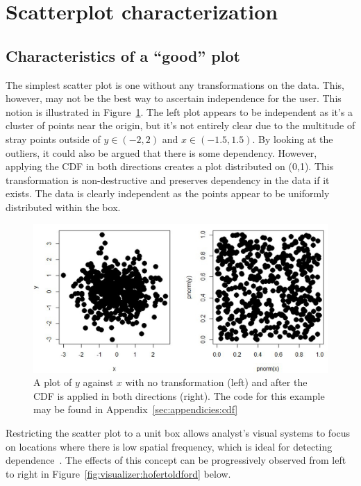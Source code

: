 \section{Scatterplot characterization}
\label{sec:visualizer:scatterplot}

\subsection{Characteristics of a ``good'' plot}
\label{sec:visualizer:scatterplot:goodplot}

The simplest scatter plot is one without any transformations on the data. This,
however, may not be the best way to ascertain independence for the user. This
notion is illustrated in Figure~\ref{fig:visualizer:cdf}. The left plot appears
to be independent as it's a cluster of points near the origin, but it's not
entirely clear due to the multitude of stray points outside of $y\in (-2,2)$ 
and $x\in(-1.5,1.5)$. By looking at the outliers, it could also be argued that 
there is some dependency. However, applying the CDF in both directions creates 
a plot distributed on (0,1). This transformation is non-destructive and 
preserves dependency in the data if it exists. The data is clearly independent 
as the points appear to be uniformly distributed within the box.

\begin{figure}[htb]
	\begin{center}
		\includegraphics[width=0.75\linewidth]{ch-visualizer/figures/cdf}
		\caption[A plot of $y$ against $x$ after the CDF is applied in both
		directions.]{A plot of $y$ against $x$ with no transformation (left) 
		and after
			the CDF is applied in both directions (right). The code for this 
			example may be
			found in Appendix~\ref{sec:appendicies:cdf}}
		\label{fig:visualizer:cdf}
	\end{center}
\end{figure}

Restricting the scatter plot to a unit box allows analyst's visual systems to 
focus on locations where there is low spatial frequency, which is ideal for 
detecting dependence~\cite{hofert2016}. The effects of this concept can be 
progressively observed from left to right in 
Figure~\ref{fig:visualizer:hofertoldford} below.

